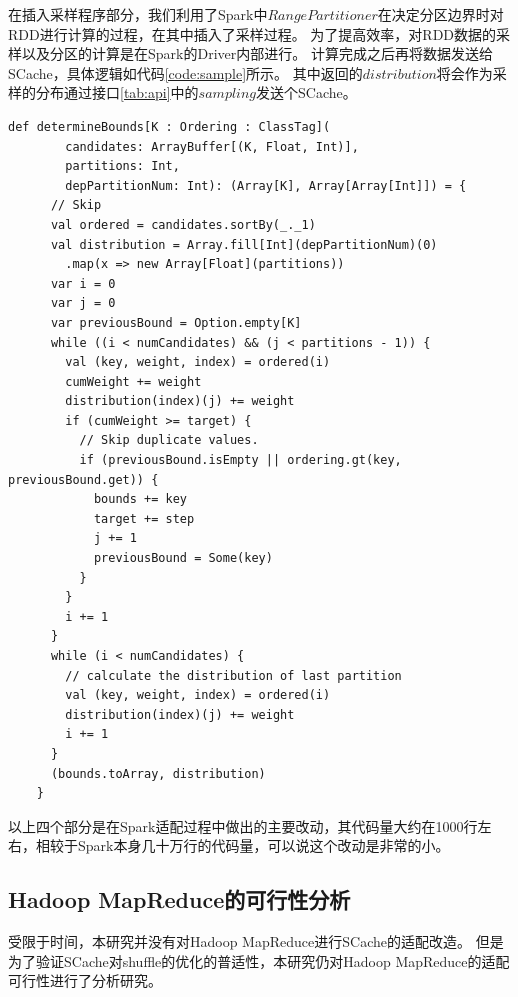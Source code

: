 在插入采样程序部分，我们利用了Spark中$RangePartitioner$在决定分区边界时对RDD进行计算的过程，在其中插入了采样过程。
为了提高效率，对RDD数据的采样以及分区的计算是在Spark的Driver内部进行。
计算完成之后再将数据发送给SCache，具体逻辑如代码\ref{code:sample}所示。
其中返回的$distribution$将会作为采样的分布通过接口\ref{tab:api}中的$sampling$发送个SCache。

\begin{lstlisting}[style={myScalastyle}, caption={水塘采样代码片段}, label={code:sample}]
    def determineBounds[K : Ordering : ClassTag](
        candidates: ArrayBuffer[(K, Float, Int)],
        partitions: Int,
        depPartitionNum: Int): (Array[K], Array[Array[Int]]) = {
      // Skip
      val ordered = candidates.sortBy(_._1)
      val distribution = Array.fill[Int](depPartitionNum)(0)
        .map(x => new Array[Float](partitions))
      var i = 0
      var j = 0
      var previousBound = Option.empty[K]
      while ((i < numCandidates) && (j < partitions - 1)) {
        val (key, weight, index) = ordered(i)
        cumWeight += weight
        distribution(index)(j) += weight
        if (cumWeight >= target) {
          // Skip duplicate values.
          if (previousBound.isEmpty || ordering.gt(key, previousBound.get)) {
            bounds += key
            target += step
            j += 1
            previousBound = Some(key)
          }
        }
        i += 1
      }
      while (i < numCandidates) {
        // calculate the distribution of last partition
        val (key, weight, index) = ordered(i)
        distribution(index)(j) += weight
        i += 1
      }
      (bounds.toArray, distribution)
    }
\end{lstlisting}

以上四个部分是在Spark适配过程中做出的主要改动，其代码量大约在1000行左右，相较于Spark本身几十万行的代码量，可以说这个改动是非常的小。

\subsection{Hadoop MapReduce的可行性分析}

受限于时间，本研究并没有对Hadoop MapReduce进行SCache的适配改造。
但是为了验证SCache对shuffle的优化的普适性，本研究仍对Hadoop MapReduce的适配可行性进行了分析研究。

